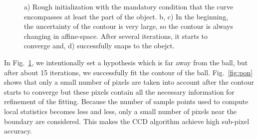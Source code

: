 \begin{figure}[htbp]
  \begin{minipage}[t]{0.5\linewidth} 
    \centering 
  \end{minipage} 
\caption[Segmentation of a ball] {a) Rough initialization with the
  mandatory condition that the curve encompasses at least the part of
  the object. b, c) In the beginning, the uncertainty of
  the contour is very large, so the contour is always changing in
  affine-space. After several iterations, it starts to converge and, 
  d) successfully snaps to the obejct.
\label{fig:sab}
}
\end{figure}

In Fig.~\ref{fig:sab}, we intentionally set a hypothesis which is far away
from the ball, but after about 15 iterations, we successfully fit the
contour of the ball. %
Fig.~\ref{fig:pon} shows
that only a small number of pixels are taken into account after the
contour starts to converge but these pixels contain all the
necessary information for refinement of the fitting. Because the
number of sample points used to compute local statistics 
becomes less and less, only a small number of pixels near the boundary
are considered. This makes the CCD algorithm achieve high
sub-pixel accuracy.

